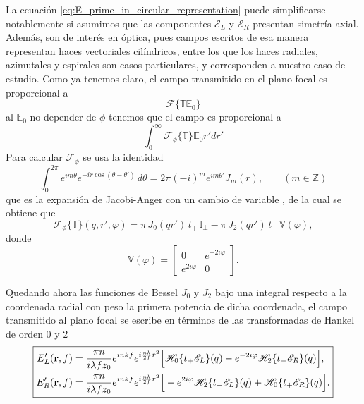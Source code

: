 La ecuación \eqref{eq:E_prime_in_circular_representation} puede simplificarse notablemente si asumimos que las componentes $\mathscr E_L$ y $\mathscr E_R$ presentan simetría axial. Además, son de interés en óptica, pues campos escritos de esa manera representan haces vectoriales cilíndricos, entre los que los haces radiales, azimutales y espirales son casos particulares, y corresponden a nuestro caso de estudio. Como ya tenemos claro, el campo transmitido en el plano focal es proporcional a
\begin{equation}
  \mathscr F \{ \mathbb T \mathbb E_0 \}
\end{equation}
al $\mathbb E_0$ no depender de $\phi$ tenemos que el campo es proporcional a
\begin{equation}
  \int_0^{\infty} \mathscr F_\phi \{ \mathbb T\} \mathbb E_0 r'dr'
\end{equation}
Para calcular $\mathscr{F}_\phi$ se usa la identidad
\begin{equation}
\int_0^{2\pi} e^{im\theta}e^{-ir\cos(\theta - \theta')}\,d\theta
=
2\pi(-i)^m e^{im\theta'} J_m(r),
\qquad (m\in\mathbb Z)
\end{equation}
que es la expansión de Jacobi-Anger con un cambio de variable \cite{Watson1944}, de la cual se obtiene que
\begin{equation}
  \mathscr{F}_\phi\{\mathbb{T}\}(q, r', \varphi)
  =
  \pi\,J_0(qr')\,t_+\,\mathbb{I}_\perp
  -
  \pi\,J_2(qr')\,t_-\,\mathbb{V}(\varphi),
  \label{eq:Fphi_M_circular}
\end{equation}
donde
\begin{equation}
\mathbb V(\varphi)
=
\begin{bmatrix}
0 & e^{-2i\varphi}
\\
e^{2i\varphi} & 0
\end{bmatrix}.
\label{eq:def_V_mixing}
\end{equation}

Quedando ahora las funciones de Bessel $J_0$ y $J_2$ bajo una integral respecto a la coordenada radial con peso la primera potencia de dicha coordenada, el campo transmitido al plano focal se escribe en términos de las transformadas de Hankel de orden 0 y 2
\begin{equation}
\boxed{
\begin{aligned}
E'_L(\vb r,f)
&=
\frac{\pi n}{i\lambda f z_0}
e^{inkf}
e^{i\frac{nk}{2f}r^2}
\Big[
\mathscr H_0\{t_+\mathscr E_L\}(q)
-
e^{-2i\varphi}
\mathscr H_2\{t_-\mathscr E_R\}(q)
\Big],
\\
E'_R(\vb r,f)
&=
\frac{\pi n}{i\lambda f z_0}
e^{inkf}
e^{i\frac{nk}{2f}r^2}
\Big[
-e^{2i\varphi} \mathscr H_2\{t_-\mathscr E_L\}(q)
+
\mathscr H_0\{t_+\mathscr E_R\}(q)
\Big].
\end{aligned}
\label{eq:E_L_E_R_Hankel}
}
\end{equation}


